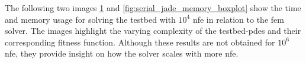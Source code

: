\documentclass[./\jobname.tex]{subfiles}
\begin{document}
The following two images \ref{fig:serial_jade_time_boxplot} and \ref{fig:serial_jade_memory_boxplot} show the time and memory usage for solving the testbed with $10^4$ \gls{nfe} in relation to the \gls{fem} solver. The images highlight the varying complexity of the testbed-\gls{pde}s and their corresponding fitness function. Although these results are not obtained for $10^6$ \gls{nfe}, they provide insight on how the solver scales with more \gls{nfe}. 

\begin{figure}[H]
	\centering
	\noindent{}
	\label{fig:serial_jade_time_boxplot}
\end{figure}
\end{document}
